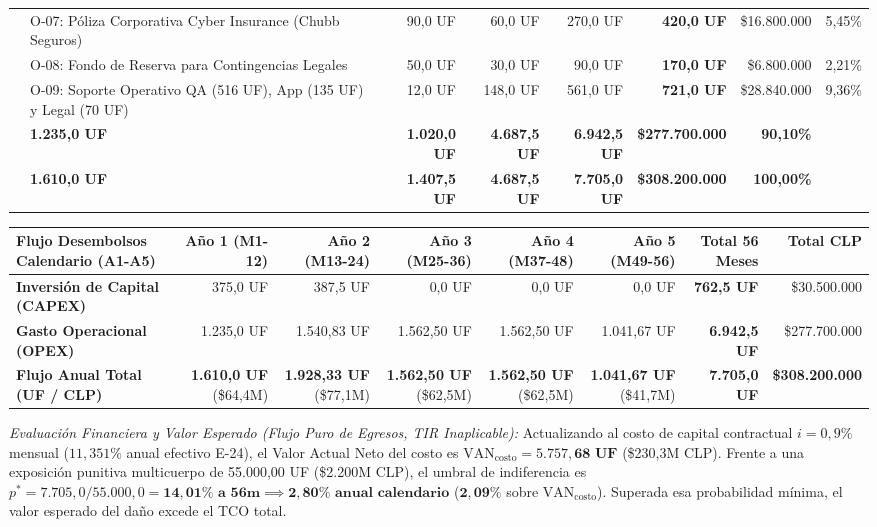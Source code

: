 \documentclass[7.5pt,letterpaper]{article}
\begin{document}
\begin{tabularx}{\textwidth}{@{} l >{\raggedright\arraybackslash}X r r r r r r @{}}
& O-07: Póliza Corporativa Cyber Insurance (Chubb Seguros) & 90,0 UF & 60,0 UF & 270,0 UF & \textbf{420,0 UF} & \$16.800.000 & 5,45\% \\
\rowcolor{RowAltBg}
& O-08: Fondo de Reserva para Contingencias Legales & 50,0 UF & 30,0 UF & 90,0 UF & \textbf{170,0 UF} & \$6.800.000 & 2,21\% \\
& O-09: Soporte Operativo QA (516 UF), App (135 UF) y Legal (70 UF) & 12,0 UF & 148,0 UF & 561,0 UF & \textbf{721,0 UF} & \$28.840.000 & 9,36\% \\
\rowcolor{TableHeadBg}
\multicolumn{2}{@{}l}{\textbf{SUBTOTAL COSTOS OPERACIONALES (OPEX)}} & \textbf{1.235,0 UF} & \textbf{1.020,0 UF} & \textbf{4.687,5 UF} & \textbf{6.942,5 UF} & \textbf{\$277.700.000} & \textbf{90,10\%} \\
\midrule
\rowcolor{NavyPrimary!15}
\multicolumn{2}{@{}l}{\textbf{TOTAL TCO CONSOLIDADO (56 MESES)}} & \textbf{1.610,0 UF} & \textbf{1.407,5 UF} & \textbf{4.687,5 UF} & \textbf{7.705,0 UF} & \textbf{\$308.200.000} & \textbf{100,00\%} \\
\bottomrule
\end{tabularx}

\vspace{1.0pt}
\begin{tabularx}{\textwidth}{@{} >{\raggedright\arraybackslash}X r r r r r r r @{}}
\toprule
\rowcolor{TableHeadBg}
\textbf{Flujo Desembolsos Calendario (A1-A5)} & \textbf{Año 1 (M1-12)} & \textbf{Año 2 (M13-24)} & \textbf{Año 3 (M25-36)} & \textbf{Año 4 (M37-48)} & \textbf{Año 5 (M49-56)} & \textbf{Total 56 Meses} & \textbf{Total CLP} \\
\midrule
\textbf{Inversión de Capital (CAPEX)} & 375,0 UF & 387,5 UF & 0,0 UF & 0,0 UF & 0,0 UF & \textbf{762,5 UF} & \$30.500.000 \\
\rowcolor{RowAltBg}
\textbf{Gasto Operacional (OPEX)} & 1.235,0 UF & 1.540,83 UF & 1.562,50 UF & 1.562,50 UF & 1.041,67 UF & \textbf{6.942,5 UF} & \$277.700.000 \\
\rowcolor{NavyPrimary!10}
\textbf{Flujo Anual Total (UF / CLP)} & \textbf{1.610,0 UF} (\$64,4M) & \textbf{1.928,33 UF} (\$77,1M) & \textbf{1.562,50 UF} (\$62,5M) & \textbf{1.562,50 UF} (\$62,5M) & \textbf{1.041,67 UF} (\$41,7M) & \textbf{7.705,0 UF} & \textbf{\$308.200.000} \\
\bottomrule
\end{tabularx}

\vspace{0.8pt}
\tiny
\textit{Evaluación Financiera y Valor Esperado (Flujo Puro de Egresos, TIR Inaplicable):} Actualizando al costo de capital contractual $i = 0,9\%$ mensual ($11,351\%$ anual efectivo E-24), el Valor Actual Neto del costo es $\text{VAN}_{\text{costo}} = \mathbf{5.757,68\text{ UF}}$ (\$230,3M CLP). Frente a una exposición punitiva multicuerpo de 55.000,00 UF (\$2.200M CLP), el umbral de indiferencia es $p^* = 7.705,0 / 55.000,0 = \mathbf{14,01\%\text{ a 56m}} \implies \mathbf{2,80\%\text{ anual calendario}}$ ($\mathbf{2,09\%}$ sobre $\text{VAN}_{\text{costo}}$). Superada esa probabilidad mínima, el valor esperado del daño excede el TCO total.
\end{document}
